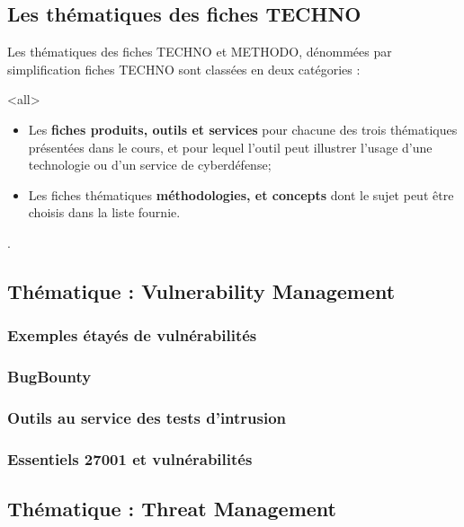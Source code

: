 \subsection{Les thématiques des fiches TECHNO}

Les thématiques des fiches TECHNO et METHODO, dénommées par  simplification fiches TECHNO sont classées en deux catégories :

\mode<all>{
{
\begin{itemize}
  \item Les\textbf{ fiches produits, outils et services }pour chacune des trois thématiques présentées dans le cours, et pour lequel l'outil peut illustrer l'usage d'une technologie ou d'un service  de cyberdéfense;
  \item Les fiches thématiques  \textbf{méthodologies,  et concepts } dont le sujet peut être choisis dans la liste fournie.
\end{itemize}
}} %


.

\subsection{Thématique : Vulnerability Management}
\subsubsection{Exemples étayés de vulnérabilités}
\subsubsection{BugBounty}
\subsubsection{Outils au service des tests d'intrusion}
\subsubsection{Essentiels 27001 et vulnérabilités}


\subsection{Thématique : Threat Management}
